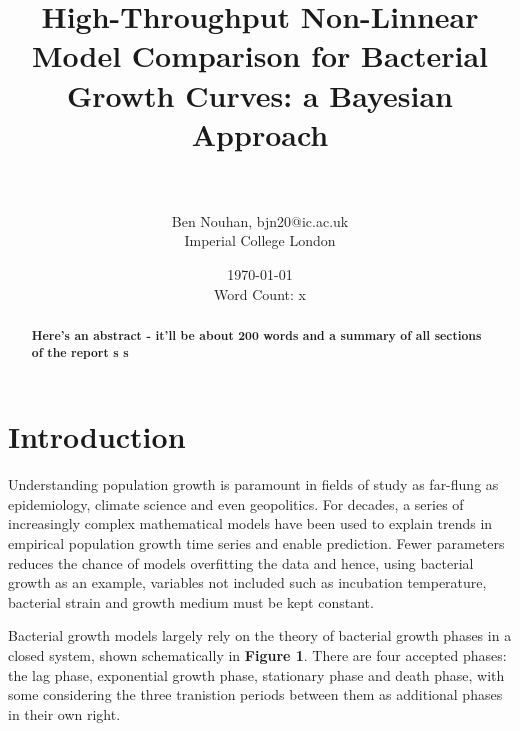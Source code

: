 \documentclass[11pt]{article}
\title{High-Throughput Non-Linnear Model Comparison for Bacterial Growth Curves: a Bayesian Approach}
\author{\\ \\ Ben Nouhan, bjn20@ic.ac.uk \\ Imperial College London \\}
\date{\today \\ Word Count: x}
\begin{document}
\maketitle
\thispagestyle{empty}

\vspace{30mm}
\onehalfspacing
\renewcommand{\abstractname}{\vspace{-\baselineskip}} %

\begin{abstract}
    \linenumbers
    \noindent
    \textbf{Here's an abstract - it'll be about 200 words and a summary of all sections of the report s s
    }
\end{abstract}
\vspace{10mm}


\newpage
\tableofcontents
\thispagestyle{empty}

\newpage
\linenumbers
\setcounter{page}{1}
\section{Introduction}%


Understanding population growth is paramount in fields of study as far-flung as epidemiology, climate science and even geopolitics.\parencite{Ozgul2010,Peleg1997} For decades, a series of increasingly complex mathematical models have been used to explain trends in empirical population growth time series and enable prediction.\parencite{Kingsland1982,Grijspeerdt1999,Tjørve2017} Fewer parameters reduces the chance of models overfitting the data and hence, using bacterial growth as an example, variables not included such as incubation temperature, bacterial strain and growth medium must be kept constant.

Bacterial growth models largely rely on the theory of bacterial growth phases in a closed system, shown schematically in \textbf{Figure 1}. There are four accepted phases: the lag phase, exponential growth phase, stationary phase and death phase, with some considering the three tranistion periods between them as additional phases in their own right.\parencite{Buchanan1918}
\end{document}
